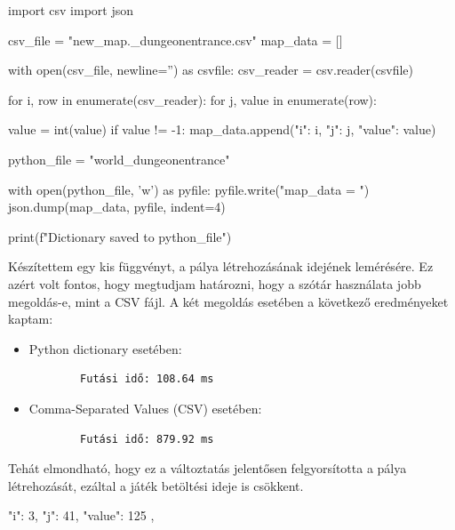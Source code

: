 \begin{python}[caption={CSV formátum dictionary formátumra konvertálása},label=py:csvtodict]
    import csv
    import json
    
    csv_file = "new_map\MSmap._dungeonentrance.csv"
    map_data = []
    
    with open(csv_file, newline='') as csvfile:
        csv_reader = csv.reader(csvfile)
    
        for i, row in enumerate(csv_reader):
            for j, value in enumerate(row):
    
                value = int(value)
                if value != -1:
                    map_data.append({"i": i, "j": j, "value": value})
    
    python_file = "world_dungeonentrance"
    
    with open(python_file, 'w') as pyfile:
        pyfile.write("map_data = ")
        json.dump(map_data, pyfile, indent=4)
    
    print(f"Dictionary saved to {python_file}")
    
\end{python}


Készítettem egy kis függvényt, a pálya létrehozásának idejének lemérésére. Ez azért volt fontos, hogy megtudjam határozni, hogy a szótár használata jobb megoldás-e, mint a CSV fájl. A két megoldás esetében a következő eredményeket kaptam:

\begin{itemize}
    
    \item Python dictionary esetében:
    \begin{verbatim}
        Futási idő: 108.64 ms
    \end{verbatim}
    \item Comma-Separated Values (CSV) esetében:
    \begin{verbatim}
        Futási idő: 879.92 ms
    \end{verbatim}
\end{itemize}
    
 Tehát elmondható, hogy ez a változtatás jelentősen felgyorsította a pálya létrehozását, ezáltal a játék betöltési ideje is csökkent.



\begin{python}[caption={Minta az átalakított struktúrára
    }, label=py:átalakított struktúra]
    {
        "i": 3,
        "j": 41,
        "value": 125
    },
\end{python}


